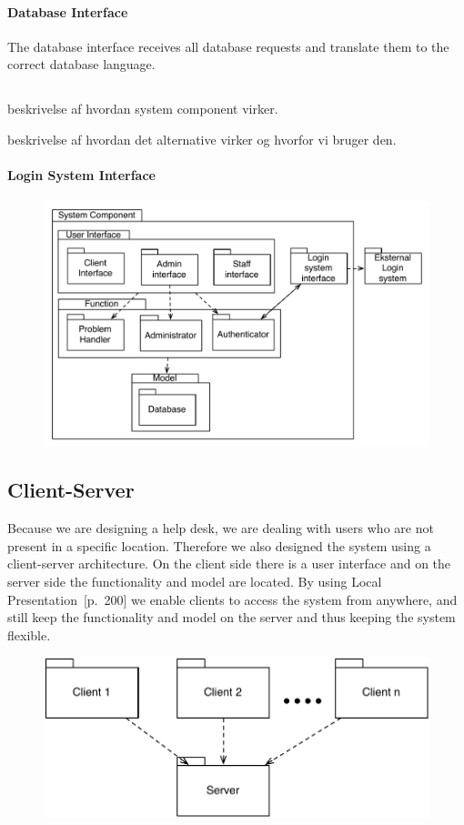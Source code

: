 \paragraph{Database Interface}
The database interface receives all database requests and translate them to the correct database language.

\subsection{}
beskrivelse af hvordan system component virker.

beskrivelse af hvordan det alternative virker og hvorfor vi bruger den.

\paragraph{Login System Interface}


\begin{figure}[]
	\centering
	\includegraphics[scale=0.5]{input/architectural_design/system_component_denalternative.pdf}
	\morscaption{}
	\label{fig:SystemComponent}
\end{figure}


\subsection{Client-Server}
Because we are designing a help desk, we are dealing with users who are not present in a specific location. Therefore we also designed the system using a client-server architecture.
On the client side there is a user interface and on the server side the functionality and model are located. By using Local Presentation~\cite{roedeaalborg}[p.~200] we enable clients to access the system from anywhere, and still keep the functionality and model on the server and thus keeping the system flexible.         

\begin{figure}%
\includegraphics[scale=0.5]{input/architectural_design/client-server-architecture-pattern.pdf}%
\caption{}%
\label{}%
\end{figure}